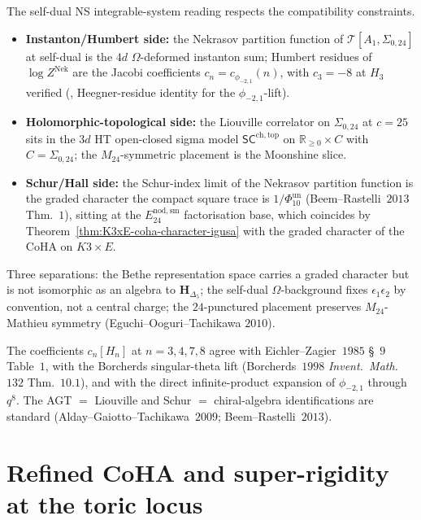 \begin{remark}
\label{rem:tcy3-nekrasov-cross-volume-discipline}
The self-dual NS integrable-system reading respects the
compatibility constraints.
\begin{itemize}
\item \textbf{Instanton/Humbert side:} the Nekrasov partition function of
$\mathcal T[A_1,\Sigma_{0,24}]$ at self-dual is the $4d$
$\Omega$-deformed instanton sum; Humbert residues of
$\log Z^{\mathrm{Nek}}$ are the Jacobi coefficients
$c_n = c_{\phi_{-2,1}}(n)$, with $c_3 = -8$ at $H_3$ verified
(\cite{VolI}, Heegner-residue identity for the
$\phi_{-2,1}$-lift).
\item \textbf{Holomorphic-topological side:} the Liouville correlator on
$\Sigma_{0,24}$ at $c = 25$ sits in the $3d$ HT open-closed
sigma model $\mathsf{SC}^{\mathrm{ch,top}}$ on
$\mathbb R_{\geq 0}\times C$ with $C = \Sigma_{0,24}$; the
$M_{24}$-symmetric placement is the Moonshine slice.
\item \textbf{Schur/Hall side:} the Schur-index limit of the
Nekrasov partition function is the graded character
  the compact square trace is \(1/\Phi_{10}^{\mathrm{un}}\)
(Beem--Rastelli~$2013$ Thm.~$1$), sitting at the
$E^{\mathrm{nod,sm}}_{24}$ factorisation base, which
coincides by Theorem~\ref{thm:K3xE-coha-character-igusa} with
the graded character of the CoHA on $K3\times E$.
\end{itemize}
Three separations: the Bethe representation space carries a
graded character but is not isomorphic as an algebra to
$\mathbf H_{\Delta_5}$; the self-dual \(\Omega\)-background fixes
\(\epsilon_1\epsilon_2\) by convention, not a central
charge; the $24$-punctured placement preserves $M_{24}$-Mathieu
symmetry (Eguchi--Ooguri--Tachikawa $2010$).
\end{remark}
The coefficients \(c_n[H_n]\) at \(n=3,4,7,8\) agree with
Eichler--Zagier~$1985$ \S~$9$ Table~$1$, with the Borcherds
singular-theta lift (Borcherds~$1998$ \emph{Invent.\ Math.}~$132$
Thm.~$10.1$), and with
the direct infinite-product expansion of \(\phi_{-2,1}\) through
\(q^8\). The AGT \(=\) Liouville and Schur \(=\) chiral-algebra
identifications are standard (Alday--Gaiotto--Tachikawa~$2009$;
Beem--Rastelli~$2013$).

\section{Refined CoHA and super-rigidity at the toric locus}
\label{sec:refined-coha-super-rigidity}

